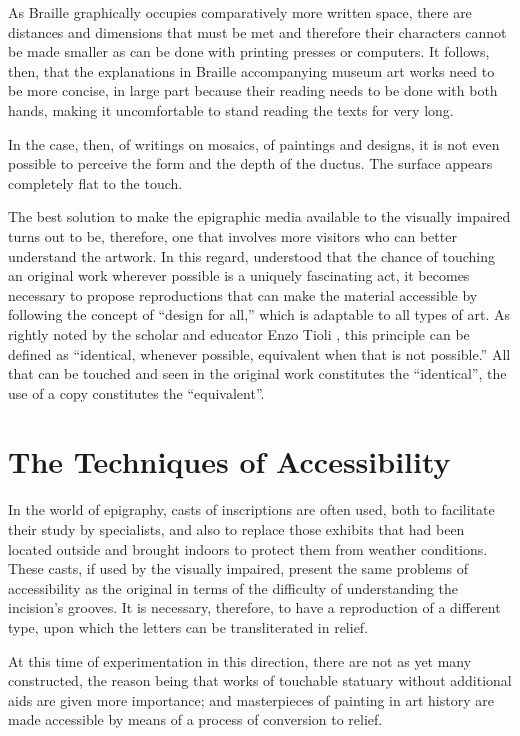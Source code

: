\documentclass[amsthm,ebook]{saparticle}
\begin{document}
As Braille graphically occupies comparatively more written space, there are distances and dimensions that must be met
and therefore their characters cannot be made smaller as can be done with printing presses or computers. It follows,
then, that the explanations in Braille accompanying museum art works need to be more concise, in large part because
their reading needs to be done with both hands, making it uncomfortable to stand reading the texts for very long.

In the case, then, of writings on mosaics, of paintings and designs, it is not even possible to perceive the form and
the depth of the ductus. The surface appears completely flat to the touch.

The best solution to make the epigraphic media available to the visually impaired turns out to be, therefore, one that
involves more visitors who can better understand the artwork. In this regard, understood that the chance of
touching an original work wherever possible is a uniquely fascinating act, it becomes necessary to propose
reproductions that can make the material accessible by following the concept of ``design for all,'' which is adaptable to
all types of art. As rightly noted by the scholar and educator Enzo Tioli \citep{Tioli2006},
this principle can be defined as ``identical, whenever possible, equivalent when that is not possible.'' All that can be
touched and seen in the original work constitutes the ``identical'', the use of a copy constitutes the ``equivalent''.







\section{The Techniques of Accessibility}
\noindent In the world of epigraphy, casts of inscriptions are often used, both to facilitate their study by specialists,
and also to replace those exhibits that had been located outside and brought indoors to protect them from weather
conditions. These casts, if used by the visually impaired, present the same problems of accessibility as the original
in terms of the difficulty of understanding the incision’s grooves. It is necessary, therefore, to have a reproduction
of a different type, upon which the letters can be transliterated in relief.

At this time of experimentation in this direction, there are not as yet many constructed, the reason being that works of
touchable statuary without additional aids are given more importance; and masterpieces of painting in art history are
made accessible by means of a process of conversion to relief.
\end{document}
